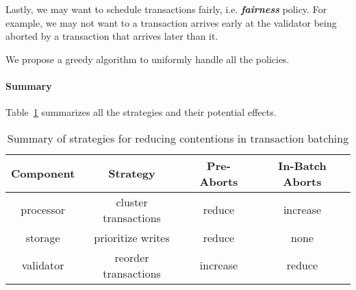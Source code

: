 Lastly, we may want to schedule transactions fairly, i.e. \textbf{\emph{fairness}} policy. For example, we may not want to a transaction arrives early at the validator being aborted by a transaction that arrives later than it. 

We propose a greedy algorithm to uniformly handle all the policies.

\paragraph{Summary}
Table~\ref{design:tbl:batch} summarizes all the strategies and their potential effects.


\begin{table}
\centering
\begin{tabular}[h]{|c|c|c|c|}
\hline
Component & Strategy & Pre-Aborts & In-Batch Aborts \\
\hline
processor & cluster transactions & reduce & increase \\
storage & prioritize writes & reduce & none \\
validator & reorder transactions & increase & reduce \\
\hline
\end{tabular}
\caption{Summary of strategies for reducing contentions in transaction batching}
\label{design:tbl:batch}
\end{table}